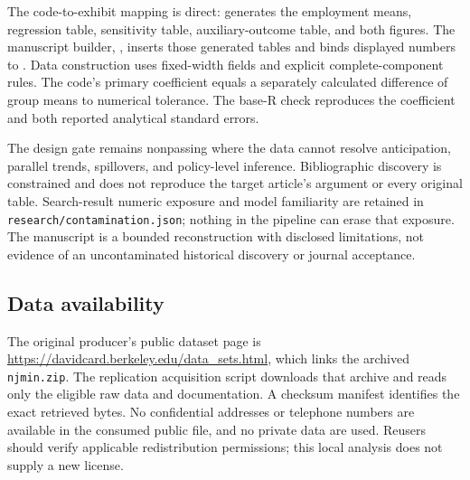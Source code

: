 \documentclass[11pt]{article}
\begin{document}
The code-to-exhibit mapping is direct:  generates the employment means, regression table, sensitivity table, auxiliary-outcome table, and both figures. The manuscript builder, , inserts those generated tables and binds displayed numbers to . Data construction uses fixed-width fields and explicit complete-component rules. The code's primary coefficient equals a separately calculated difference of group means to numerical tolerance. The base-R check reproduces the coefficient and both reported analytical standard errors. %

The design gate remains nonpassing where the data cannot resolve anticipation, parallel trends, spillovers, and policy-level inference. Bibliographic discovery is constrained and does not reproduce the target article's argument or every original table. Search-result numeric exposure and model familiarity are retained in \texttt{research/contamination.json}; nothing in the pipeline can erase that exposure. The manuscript is a bounded reconstruction with disclosed limitations, not evidence of an uncontaminated historical discovery or journal acceptance. %

\subsection*{Data availability}
The original producer's public dataset page is \url{https://davidcard.berkeley.edu/data_sets.html}, which links the archived \texttt{njmin.zip}. The replication acquisition script downloads that archive and reads only the eligible raw data and documentation. A checksum manifest identifies the exact retrieved bytes. No confidential addresses or telephone numbers are available in the consumed public file, and no private data are used. Reusers should verify applicable redistribution permissions; this local analysis does not supply a new license. %



\end{document}

